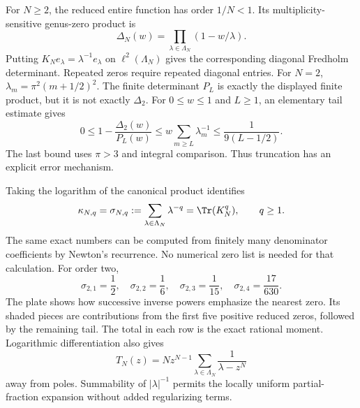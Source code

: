 For $N\ge2$, the reduced entire function has order $1/N<1$. Its multiplicity-sensitive genus-zero product is
\[
\Delta_N(w)=\prod_{\lambda\in\Lambda_N}(1-w/\lambda).
\]
Putting $K_Ne_\lambda=\lambda^{-1}e_\lambda$ on $\ell^2(\Lambda_N)$ gives the corresponding diagonal Fredholm determinant. Repeated zeros require repeated diagonal entries.
For $N=2$, $\lambda_m=\pi^2(m+1/2)^2$. The finite determinant $P_L$ is exactly the displayed finite product, but it is not exactly $\Delta_2$. For $0\le w\le1$ and $L\ge1$, an elementary tail estimate gives
\[
0\le1-\frac{\Delta_2(w)}{P_L(w)}
\le w\sum_{m\ge L}\lambda_m^{-1}
\le\frac1{9(L-1/2)}.
\]
The last bound uses $\pi>3$ and integral comparison. Thus truncation has an explicit error mechanism.

Taking the logarithm of the canonical product identifies
\[
\kappa_{N,q}=\sigma_{N,q}:=\sum_{\lambda\in\Lambda_N}\lambda^{-q}
=\Tr(K_N^q),\qquad q\ge1.
\]
The same exact numbers can be computed from finitely many denominator coefficients by Newton's recurrence. No numerical zero list is needed for that calculation.
For order two,
\[
\sigma_{2,1}=\frac12,\quad\sigma_{2,2}=\frac16,\quad
\sigma_{2,3}=\frac1{15},\quad\sigma_{2,4}=\frac{17}{630}.
\]
The plate shows how successive inverse powers emphasize the nearest zero. Its shaded pieces are contributions from the first five positive reduced zeros, followed by the remaining tail. The total in each row is the exact rational moment.
Logarithmic differentiation also gives
\[
T_N(z)=Nz^{N-1}\sum_{\lambda\in\Lambda_N}\frac1{\lambda-z^N}
\]
away from poles. Summability of $|\lambda|^{-1}$ permits the locally uniform partial-fraction expansion without added regularizing terms.

